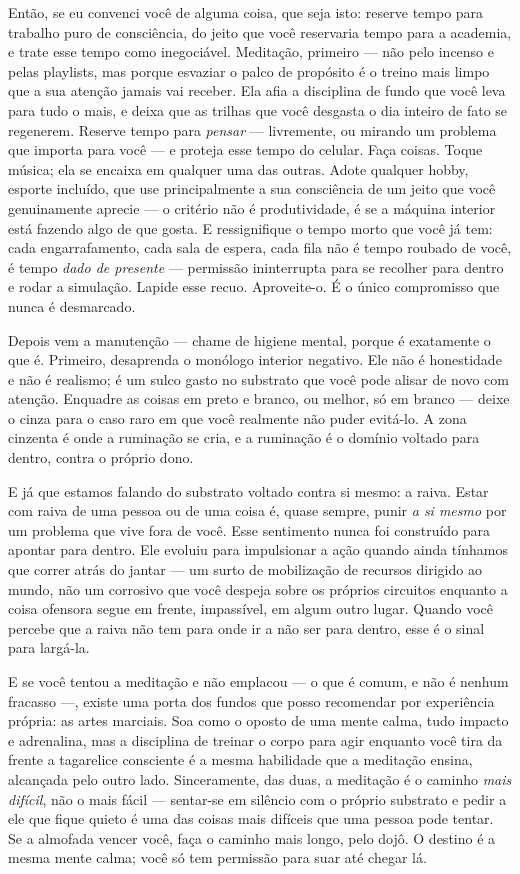 \documentclass[11pt, twoside, openright]{book}
\begin{document}
Então, se eu convenci você de alguma coisa, que seja isto: reserve tempo para trabalho puro de consciência, do jeito que você reservaria tempo para a academia, e trate esse tempo como inegociável. Meditação, primeiro --- não pelo incenso e pelas playlists, mas porque esvaziar o palco de propósito é o treino mais limpo que a sua atenção jamais vai receber. Ela afia a disciplina de fundo que você leva para tudo o mais, e deixa que as trilhas que você desgasta o dia inteiro de fato se regenerem. Reserve tempo para \textit{pensar} --- livremente, ou mirando um problema que importa para você --- e proteja esse tempo do celular. Faça coisas. Toque música; ela se encaixa em qualquer uma das outras. Adote qualquer hobby, esporte incluído, que use principalmente a sua consciência de um jeito que você genuinamente aprecie --- o critério não é produtividade, é se a máquina interior está fazendo algo de que gosta. E ressignifique o tempo morto que você já tem: cada engarrafamento, cada sala de espera, cada fila não é tempo roubado de você, é tempo \textit{dado de presente} --- permissão ininterrupta para se recolher para dentro e rodar a simulação. Lapide esse recuo. Aproveite-o. É o único compromisso que nunca é desmarcado.

Depois vem a manutenção --- chame de higiene mental, porque é exatamente o que é. Primeiro, desaprenda o monólogo interior negativo. Ele não é honestidade e não é realismo; é um sulco gasto no substrato que você pode alisar de novo com atenção. Enquadre as coisas em preto e branco, ou melhor, só em branco --- deixe o cinza para o caso raro em que você realmente não puder evitá-lo. A zona cinzenta é onde a ruminação se cria, e a ruminação é o domínio voltado para dentro, contra o próprio dono.

E já que estamos falando do substrato voltado contra si mesmo: a raiva. Estar com raiva de uma pessoa ou de uma coisa é, quase sempre, punir \textit{a si mesmo} por um problema que vive fora de você. Esse sentimento nunca foi construído para apontar para dentro. Ele evoluiu para impulsionar a ação quando ainda tínhamos que correr atrás do jantar --- um surto de mobilização de recursos dirigido ao mundo, não um corrosivo que você despeja sobre os próprios circuitos enquanto a coisa ofensora segue em frente, impassível, em algum outro lugar. Quando você percebe que a raiva não tem para onde ir a não ser para dentro, esse é o sinal para largá-la.

E se você tentou a meditação e não emplacou --- o que é comum, e não é nenhum fracasso ---, existe uma porta dos fundos que posso recomendar por experiência própria: as artes marciais. Soa como o oposto de uma mente calma, tudo impacto e adrenalina, mas a disciplina de treinar o corpo para agir enquanto você tira da frente a tagarelice consciente é a mesma habilidade que a meditação ensina, alcançada pelo outro lado. Sinceramente, das duas, a meditação é o caminho \textit{mais difícil}, não o mais fácil --- sentar-se em silêncio com o próprio substrato e pedir a ele que fique quieto é uma das coisas mais difíceis que uma pessoa pode tentar. Se a almofada vencer você, faça o caminho mais longo, pelo dojô. O destino é a mesma mente calma; você só tem permissão para suar até chegar lá.
\end{document}

